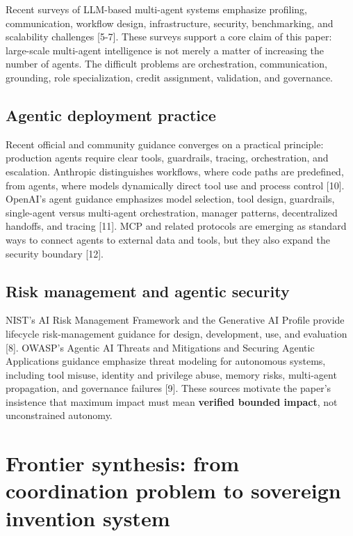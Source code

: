 \documentclass[
  11pt,
]{article}
\begin{document}
Recent surveys of LLM-based multi-agent systems emphasize profiling,
communication, workflow design, infrastructure, security, benchmarking,
and scalability challenges {[}5-7{]}. These surveys support a core claim
of this paper: large-scale multi-agent intelligence is not merely a
matter of increasing the number of agents. The difficult problems are
orchestration, communication, grounding, role specialization, credit
assignment, validation, and governance.

\subsection{Agentic deployment
practice}\label{agentic-deployment-practice}

Recent official and community guidance converges on a practical
principle: production agents require clear tools, guardrails, tracing,
orchestration, and escalation. Anthropic distinguishes workflows, where
code paths are predefined, from agents, where models dynamically direct
tool use and process control {[}10{]}. OpenAI's agent guidance
emphasizes model selection, tool design, guardrails, single-agent versus
multi-agent orchestration, manager patterns, decentralized handoffs, and
tracing {[}11{]}. MCP and related protocols are emerging as standard
ways to connect agents to external data and tools, but they also expand
the security boundary {[}12{]}.

\subsection{Risk management and agentic
security}\label{risk-management-and-agentic-security}

NIST's AI Risk Management Framework and the Generative AI Profile
provide lifecycle risk-management guidance for design, development, use,
and evaluation {[}8{]}. OWASP's Agentic AI Threats and Mitigations and
Securing Agentic Applications guidance emphasize threat modeling for
autonomous systems, including tool misuse, identity and privilege abuse,
memory risks, multi-agent propagation, and governance failures {[}9{]}.
These sources motivate the paper's insistence that maximum impact must
mean \textbf{verified bounded impact}, not unconstrained autonomy.


\section{Frontier synthesis: from coordination problem to sovereign invention system}\label{frontier-synthesis}
\end{document}
